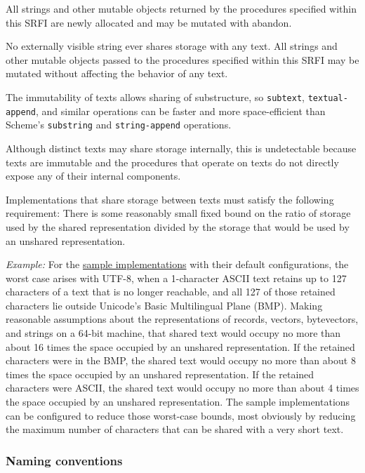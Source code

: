 All strings and other mutable objects returned by the procedures
specified within this SRFI are newly allocated and may be mutated with
abandon.

No externally visible string ever shares storage with any text. All
strings and other mutable objects passed to the procedures specified
within this SRFI may be mutated without affecting the behavior of any
text.

The immutability of texts allows sharing of substructure, so
\texttt{subtext}, \texttt{textual-append}, and similar operations can be
faster and more space-efficient than Scheme's \texttt{substring} and
\texttt{string-append} operations.

Although distinct texts may share storage internally, this is
undetectable because texts are immutable and the procedures that operate
on texts do not directly expose any of their internal components.

Implementations that share storage between texts must satisfy the
following requirement: There is some reasonably small fixed bound on the
ratio of storage used by the shared representation divided by the
storage that would be used by an unshared representation.

\emph{Example:} For the \protect\hyperlink{SampleImp}{sample
implementations} with their default configurations, the worst case
arises with UTF-8, when a 1-character ASCII text retains up to 127
characters of a text that is no longer reachable, and all 127 of those
retained characters lie outside Unicode's Basic Multilingual Plane
(BMP). Making reasonable assumptions about the representations of
records, vectors, bytevectors, and strings on a 64-bit machine, that
shared text would occupy no more than about 16 times the space occupied
by an unshared representation. If the retained characters were in the
BMP, the shared text would occupy no more than about 8 times the space
occupied by an unshared representation. If the retained characters were
ASCII, the shared text would occupy no more than about 4 times the space
occupied by an unshared representation. The sample implementations can
be configured to reduce those worst-case bounds, most obviously by
reducing the maximum number of characters that can be shared with a very
short text.

\subsubsection{{Naming conventions}}\label{naming-conventions}

